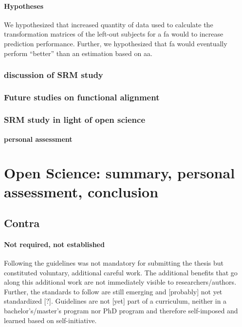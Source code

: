 \paragraph{Hypotheses}
%
We hypothesized that increased quantity of data used to calculate the
transformation matrices of the left-out subjects for a \ac{fa} would to increase
prediction performance.
%
Further, we hypothesized that \ac{fa} would eventually perform
``better'' than an estimation based on \ac{aa}.


\subsubsection{discussion of SRM study}



\subsubsection{Future studies on functional alignment}


\subsubsection{SRM study in light of open science}


\paragraph{personal assessment}



\section{Open Science: summary, personal assessment, conclusion}


\subsection{Contra}

\paragraph{Not required, not established}
%
Following the guidelines was not mandatory for submitting the thesis but
constituted voluntary, additional careful work.
%
The additional benefits that go along this additional work are not immediately
visible to researchers/authors.
%
Further, the standards to follow are still emerging and [probably] not yet
standardized [?].
%
Guidelines are not [yet] part of a curriculum, neither in a bachelor's/master's
program nor PhD program and therefore self-imposed and learned based on
self-initiative.



